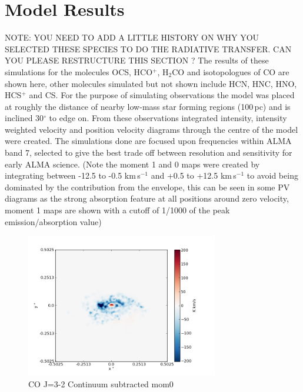 \documentclass[useAMS,usenatbib]{mn2e}
\begin{document}
\section{Model Results} \label{sec:model_results}

NOTE: YOU NEED TO ADD A LITTLE HISTORY ON WHY YOU SELECTED THESE SPECIES TO DO THE RADIATIVE TRANSFER. CAN YOU PLEASE RESTRUCTURE THIS SECTION ?
The results of these simulations for the molecules OCS, HCO$^+$, H$_2$CO and isotopologues of CO are shown here, other molecules simulated but not shown include HCN, HNC, HNO, HCS$^+$ and  CS.
For the purpose of simulating observations the model was placed at roughly the distance of nearby low-mass star forming regions (100$\,$pc) and is inclined 30$^\circ$ to edge on. From these observations integrated intensity, intensity weighted velocity and position velocity diagrams through the centre of the model were created.
The simulations done are focused upon frequencies within ALMA band 7, selected to give the best trade off between resolution and sensitivity for early ALMA science.
(Note the moment 1 and 0 maps were created by integrating between -12.5 to -0.5 km$\,$s$^{-1}$ and +0.5 to +12.5 km$\,$s$^{-1}$ to avoid being dominated by the contribution from the envelope, this can be seen in some PV diagrams as the strong absorption feature at all positions around zero velocity, moment 1 maps are shown with a cutoff of 1/1000 of the peak emission/absorption value)\newline

\begin{figure}
 \includegraphics[width=84mm]{Figures/sim/imageCO_3-2_30deg_contSub.png}

 \caption{CO J=3-2 Continuum subtracted mom0}
\end{figure}
\end{document}
